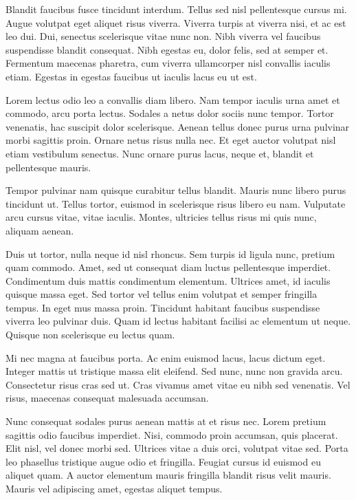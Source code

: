 \documentclass[
]{HyperedReport}
\begin{document}
\begin{fullwidth} %
	\begin{multicols}{3} %
		Blandit faucibus fusce tincidunt interdum. Tellus sed nisl pellentesque cursus mi. Augue volutpat eget aliquet risus viverra. Viverra turpis at viverra nisi, et ac est leo dui. Dui, senectus scelerisque vitae nunc non. Nibh viverra vel faucibus suspendisse blandit consequat. Nibh egestas eu, dolor felis, sed at semper et. Fermentum maecenas pharetra, cum viverra ullamcorper nisl convallis iaculis etiam. Egestas in egestas faucibus ut iaculis lacus eu ut est.
		
		Lorem lectus odio leo a convallis diam libero. Nam tempor iaculis urna amet et commodo, arcu porta lectus. Sodales a netus dolor sociis nunc tempor. Tortor venenatis, hac suscipit dolor scelerisque. Aenean tellus donec purus urna pulvinar morbi sagittis proin. Ornare netus risus nulla nec. Et eget auctor volutpat nisl etiam vestibulum senectus. Nunc ornare purus lacus, neque et, blandit et pellentesque mauris.
		
		\columnbreak %
		
		Tempor pulvinar nam quisque curabitur tellus blandit. Mauris nunc libero purus tincidunt ut. Tellus tortor, euismod in scelerisque risus libero eu nam. Vulputate arcu cursus vitae, vitae iaculis. Montes, ultricies tellus risus mi quis nunc, aliquam aenean.
	
		Duis ut tortor, nulla neque id nisl rhoncus. Sem turpis id ligula nunc, pretium quam commodo. Amet, sed ut consequat diam luctus pellentesque imperdiet. Condimentum duis mattis condimentum elementum. Ultrices amet, id iaculis quisque massa eget. Sed tortor vel tellus enim volutpat et semper fringilla tempus. In eget mus massa proin. Tincidunt habitant faucibus suspendisse viverra leo pulvinar duis. Quam id lectus habitant facilisi ac elementum ut neque. Quisque non scelerisque eu lectus quam.
		
		\columnbreak %
		
		Mi nec magna at faucibus porta. Ac enim euismod lacus, lacus dictum eget. Integer mattis ut tristique massa elit eleifend. Sed nunc, nunc non gravida arcu. Consectetur risus cras sed ut. Cras vivamus amet vitae eu nibh sed venenatis. Vel risus, maecenas consequat malesuada accumsan.
		
	Nunc consequat sodales purus aenean mattis at et risus nec. Lorem pretium sagittis odio faucibus imperdiet. Nisi, commodo proin accumsan, quis placerat. Elit nisl, vel donec morbi sed. Ultrices vitae a duis orci, volutpat vitae sed. Porta leo phasellus tristique augue odio et fringilla. Feugiat cursus id euismod eu aliquet quam. A auctor elementum mauris fringilla blandit risus velit mauris. Mauris vel adipiscing amet, egestas aliquet tempus.
	\end{multicols}
\end{fullwidth}
\end{document}
